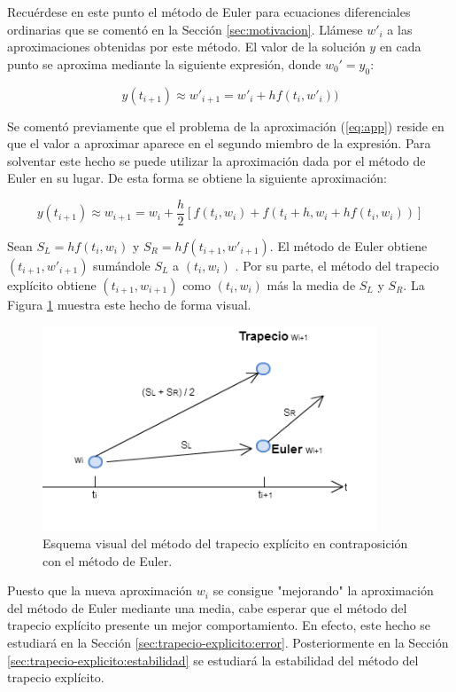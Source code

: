 \documentclass{article}
\theoremstyle{theorem-style}  %
\theoremstyle{definition-style}
\theoremstyle{example-style}
\begin{document}
		Recuérdese en este punto el método de Euler para ecuaciones diferenciales ordinarias que se comentó en la Sección \ref{sec:motivacion}. Llámese $w'_i$ a las aproximaciones obtenidas por este método. El valor de la solución $y$ en cada punto se aproxima mediante la siguiente expresión, donde $w_0' = y_0$:

		\begin{equation*} \label{eq:euler}
			y(t_{i+1}) \approx w'_{i+1} = w'_i + h f(t_i,w'_i))
		\end{equation*}

		Se comentó previamente que el problema de la aproximación (\ref{eq:app}) reside en que el valor a aproximar aparece en el segundo miembro de la expresión. Para solventar este hecho se puede utilizar la aproximación dada por el método de Euler en su lugar. De esta forma se obtiene la siguiente aproximación:

		\begin{equation} \label{eq:app-exp}
			y(t_{i+1}) \approx w_{i+1} = w_i + \frac{h}{2} \left[f(t_i,w_i) + f(t_{i}+h, w_i + h f(t_i,w_i))\right]
		\end{equation}

		Sean $S_L = h f(t_i,w_i) $ y $S_R = h f(t_{i+1}, w'_{i+1})$. El método de Euler  obtiene $(t_{i+1}, w'_{i+1})$ sumándole $S_L$ a $(t_{i}, w_{i})$ . Por su parte, el método del trapecio explícito obtiene $(t_{i+1}, w_{i+1})$ como $(t_{i}, w_{i})$ más la media de $S_L$ y $S_R$. La Figura \ref{fig:trapecio-vs-euler} muestra este hecho de forma visual.

		\begin{figure}[H]
			\centering
			\includegraphics[width=10cm]{./Images/trapecio-vs-euler.png}
			\caption{Esquema visual del método del trapecio explícito en contraposición con el método de Euler.}
			\label{fig:trapecio-vs-euler}
		\end{figure}

		Puesto que la nueva aproximación $w_i$ se consigue "mejorando" la aproximación del método de Euler mediante una media, cabe esperar que el método del trapecio explícito presente un mejor comportamiento. En efecto, este hecho se estudiará en la Sección \ref{sec:trapecio-explicito:error}. Posteriormente en la Sección \ref{sec:trapecio-explicito:estabilidad} se estudiará la estabilidad del método del trapecio explícito.
\end{document}
